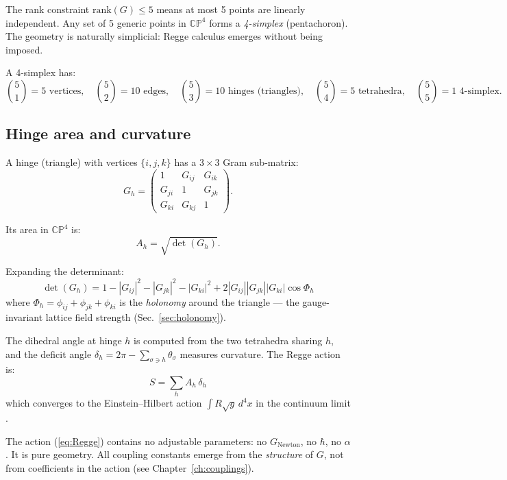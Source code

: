 The rank constraint $\text{rank}(G) \leq 5$ means at most 5 points are linearly independent. Any set of 5 generic points in $\mathbb{CP}^4$ forms a \emph{4-simplex} (pentachoron). The geometry is naturally simplicial: Regge calculus emerges without being imposed.

A 4-simplex has:
\begin{equation}
\binom{5}{1} = 5 \text{ vertices}, \quad
\binom{5}{2} = 10 \text{ edges}, \quad
\binom{5}{3} = 10 \text{ hinges (triangles)}, \quad
\binom{5}{4} = 5 \text{ tetrahedra}, \quad
\binom{5}{5} = 1 \text{ 4-simplex}.
\end{equation}

\subsection{Hinge area and curvature}

A hinge (triangle) with vertices $\{i, j, k\}$ has a $3\times 3$ Gram sub-matrix:
\begin{equation}
G_h = \begin{pmatrix} 1 & G_{ij} & G_{ik} \\ G_{ji} & 1 & G_{jk} \\ G_{ki} & G_{kj} & 1 \end{pmatrix}.
\end{equation}

Its area in $\mathbb{CP}^4$ is:
\begin{equation}
A_h = \sqrt{\det(G_h)}.
\end{equation}

Expanding the determinant:
\begin{equation}
\det(G_h) = 1 - |G_{ij}|^2 - |G_{jk}|^2 - |G_{ki}|^2 + 2|G_{ij}||G_{jk}||G_{ki}|\cos\Phi_h
\label{eq:detGh}
\end{equation}
where $\Phi_h = \phi_{ij} + \phi_{jk} + \phi_{ki}$ is the \emph{holonomy} around the triangle --- the gauge-invariant lattice field strength (Sec.~\ref{sec:holonomy}).

The dihedral angle at hinge $h$ is computed from the two tetrahedra sharing $h$, and the deficit angle $\delta_h = 2\pi - \sum_{\sigma \ni h} \theta_\sigma$ measures curvature. The Regge action is:
\begin{equation}
\boxed{S = \sum_h A_h\,\delta_h}
\label{eq:Regge}
\end{equation}
which converges to the Einstein--Hilbert action $\int R\sqrt{g}\,d^4x$ in the continuum limit \cite{Regge}.

\begin{remark}
The action (\ref{eq:Regge}) contains no adjustable parameters: no $G_\text{Newton}$, no $\hbar$, no $\alpha$. It is pure geometry. All coupling constants emerge from the \emph{structure} of $G$, not from coefficients in the action (see Chapter~\ref{ch:couplings}).
\end{remark}

